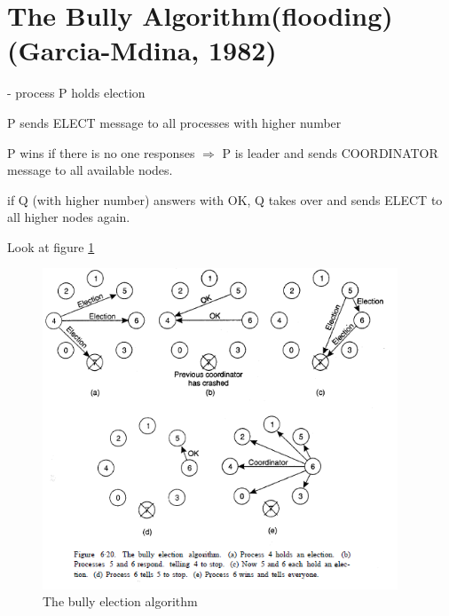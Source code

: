 \section{The Bully Algorithm(flooding) (Garcia-Mdina, 1982)}
- process P holds election
\begin{compactenum}
\item P sends ELECT message to all processes with higher number
\item P wins if there is no one responses $\Rightarrow$ P is leader and sends COORDINATOR message to all available nodes.
\item if Q (with higher number) answers with OK, Q takes over and sends ELECT to all higher nodes again.
\end{compactenum}

Look at figure \ref{img:leader1}
\begin{figure}[h]
	\centering
	\includegraphics[width=400px]{gfx/leader1.png}
	\caption{The bully election algorithm}
	\label{img:leader1}
\end{figure}


